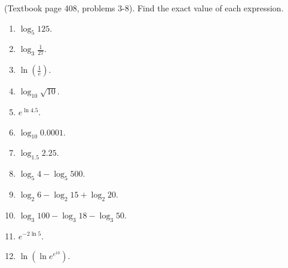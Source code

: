 
\begin{problem}(Textbook page 408, problems 3-8). Find the exact value of each expression.
\begin{multicols}{3}
\begin{enumerate}
\item $\log_5 125$.
\item $\log_3 \frac{1}{27}$.
\item $\ln \left(\frac{1}{e}\right) $.
\item $\log_{10}\sqrt{10}$.
\item $e^{\ln 4.5}$.
\item $\log_{10} 0.0001 $.
\item $\log_{1.5}2.25$.
\item $\log_5 4- \log_5 500$.
\item $\log_2 6 - \log_2 15 +\log_2 20$.
\item $\log_3 100- \log_3 18 - \log _3 50 $.
\item $e^{-2\ln 5}$.
\item $\ln \left(\ln e^{e^{10}}\right)$.
\end{enumerate}
\end{multicols}
\end{problem}